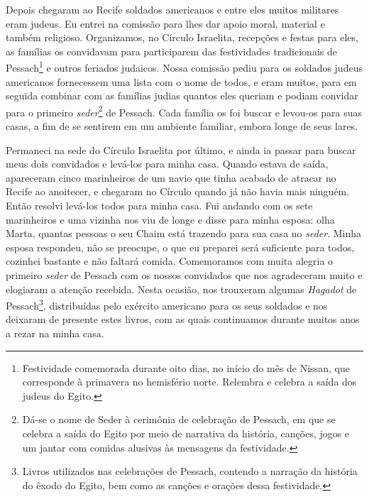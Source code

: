 Depois chegaram ao Recife soldados americanos e entre eles muitos
militares eram judeus. Eu entrei na comissão para lhes dar apoio moral,
material e também religioso. Organizamos, no Círculo Israelita,
recepções e festas para eles, as famílias os convidavam para
participarem das festividades tradicionais de Pessach\footnote{Festividade
  comemorada durante oito dias, no início do mês de Nissan, que
  corresponde à primavera no hemisfério norte. Relembra e celebra a
  saída dos judeus do Egito.} e outros feriados judaicos. Nossa comissão
pediu para os soldados judeus americanos fornecessem uma lista com o
nome de todos, e eram muitos, para em seguida combinar com as famílias
judias quantos eles queriam e podiam convidar para o primeiro
\textit{seder}\footnote{Dá-se o nome de Seder à cerimônia de celebração de
  Pessach, em que se celebra a saída do Egito por meio de narrativa da
  história, canções, jogos e um jantar com comidas alusivas às mensagens
  da festividade.} de Pessach. Cada família os foi buscar e levou-os
para suas casas, a fim de se sentirem em um ambiente familiar, embora
longe de seus lares.

Permaneci na sede do Círculo Israelita por último, e ainda ia passar
para buscar meus dois convidados e levá-los para minha casa. Quando
estava de saída, apareceram cinco marinheiros de um navio que tinha
acabado de atracar no Recife ao anoitecer, e chegaram no Círculo quando
já não havia mais ninguém. Então resolvi levá-los todos para minha casa.
Fui andando com os sete marinheiros e uma vizinha nos viu de longe e
disse para minha esposa: olha Marta, quantas pessoas o seu Chaim está
trazendo para sua casa no \textit{seder}. Minha esposa respondeu, não se
preocupe, o que eu preparei será suficiente para todos, cozinhei
bastante e não faltará comida. Comemoramos com muita alegria o primeiro
\textit{seder} de Pessach com os nossos convidados que nos agradeceram muito e
elogiaram a atenção recebida. Nesta ocasião, nos trouxeram algumas
\textit{Hagadot} de Pessach\footnote{Livros utilizados nas celebrações de
  Pessach, contendo a narração da história do êxodo do Egito, bem como
  as canções e orações dessa festividade.}, distribuídas pelo exército
americano para os seus soldados e nos deixaram de presente estes livros,
com as quais continuamos durante muitos anos a rezar na minha casa.

